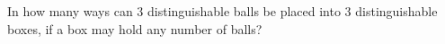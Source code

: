 In how many ways can $3$ distinguishable balls be placed into $3$ distinguishable boxes, if a box may hold any number of balls?
